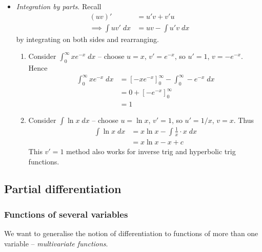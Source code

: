 \documentclass{../../template/note}
\begin{document}
    \begin{itemize}[resume]
        \item \emph{Integration by parts}. Recall
        \begin{align*}
            (uv)' &= u'v + v'u \\
            \implies \int uv'\; dx &= uv - \int u'v\; dx
        \end{align*}
        by integrating on both sides and rearranging.

        \begin{enumerate}[label=\protect\circled{\arabic*}]
            \item Consider \(\int_0^\infty xe^{-x} \; dx\) -- choose \(u = x\), \(v' = e^{-x}\), so \(u' = 1\), \(v = -e^{-x}\). Hence
            \begin{align*}
                \int_0^\infty xe^{-x} \; dx &= \left[-xe^{-x}\right]_0^\infty - \int_0^\infty -e^{-x} \; dx \\
                &= 0 + [-e^{-x}]_0^\infty \\
                &= 1
            \end{align*}
            \item Consider \(\int \ln x \; dx\) -- choose \(u = \ln x\), \(v' = 1\), so \(u' = 1/x\), \(v = x\). Thus
            \begin{align*}
                \int \ln x \; dx &= x \ln x - \int \frac{1}{x} \cdot x \; dx \\
                &= x \ln x - x + c
            \end{align*}
            This \(v' = 1\) method also works for inverse trig and hyperbolic trig functions.
            
            
        \end{enumerate}
        
        
        
    \end{itemize}
    
    \subsection{Partial differentiation}

    \subsubsection{Functions of several variables}

    We want to generalise the notion of differentiation to functions of more than one variable -- \emph{multivariate functions}.
\end{document}
